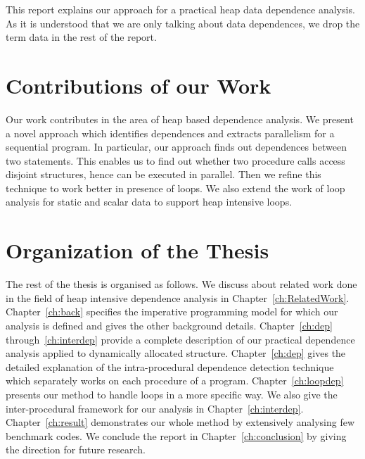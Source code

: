 This report explains our approach for a practical heap data dependence analysis. 
As it is understood that we are only talking about data dependences, we drop the term 
data in the rest of the report. 
%
\section{Contributions of our Work}
Our work contributes in the area of heap based 
dependence analysis. We present a novel approach 
which identifies dependences and extracts parallelism for a sequential program. 
In particular, our approach finds out dependences between two statements. 
This enables us to find out whether two procedure calls 
access disjoint structures, hence can be executed in parallel. 
Then we refine this technique to work better 
in presence of loops. We also extend the work of loop analysis 
for static and scalar data to support heap intensive loops.

\section{Organization of the Thesis}
The rest of the thesis is organised as follows. We discuss about related 
work done in the field of heap intensive dependence analysis in Chapter~\ref{ch:RelatedWork}.
Chapter~\ref{ch:back} specifies the imperative programming model 
for which our analysis is defined and gives the other background 
details. Chapter~\ref{ch:dep} through~\ref{ch:interdep} provide a complete 
description of our practical dependence analysis applied to 
dynamically allocated structure. Chapter~\ref{ch:dep} gives the detailed 
explanation of the intra-procedural dependence detection technique 
which separately works on each procedure of a program. Chapter~\ref{ch:loopdep} 
presents our method to handle loops in a more specific way. We also 
give the inter-procedural framework for our analysis in Chapter~\ref{ch:interdep}. 
Chapter~\ref{ch:result} demonstrates our whole method by extensively 
analysing few benchmark codes. We conclude the report in Chapter~\ref{ch:conclusion} 
by giving the direction for future research.